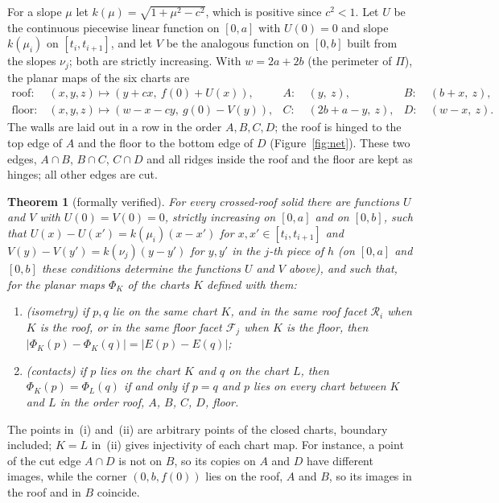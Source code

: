\documentclass[11pt]{article}
\newtheorem{theorem}{Theorem}
\theoremstyle{definition}
\theoremstyle{remark}
\newcommand{\cR}{\mathcal R}
\newcommand{\cF}{\mathcal F}
\begin{document}
For a slope $\mu$ let $k(\mu)=\sqrt{1+\mu^2-c^2}$, which is positive since
$c^2<1$. Let $U$ be the continuous piecewise linear function on $[0,a]$ with
$U(0)=0$ and slope $k(\mu_i)$ on $[t_i,t_{i+1}]$, and let $V$ be the
analogous function on $[0,b]$ built from the slopes $\nu_j$; both are
strictly increasing. With $w=2a+2b$ (the perimeter of $\Pi$), the planar
maps of the six charts are
\begin{align*}
\text{roof}:&\ (x,y,z)\mapsto(y+cx,\ f(0)+U(x)), &
A:&\ (y,\ z), & B:&\ (b+x,\ z),\\
\text{floor}:&\ (x,y,z)\mapsto(w-x-cy,\ g(0)-V(y)), &
C:&\ (2b+a-y,\ z), & D:&\ (w-x,\ z).
\end{align*}
The walls are laid out in a row in the order $A,B,C,D$; the roof is hinged to
the top edge of $A$ and the floor to the bottom edge of $D$
(Figure~\ref{fig:net}). These two edges, $A\cap B$, $B\cap C$, $C\cap D$ and all
ridges inside the roof and the floor are kept as hinges; all other edges are
cut.

\begin{theorem}[formally verified]\label{thm:main}
For every crossed-roof solid there are functions $U$ and $V$ with
$U(0)=V(0)=0$, strictly increasing on $[0,a]$ and on $[0,b]$, such that
$U(x)-U(x')=k(\mu_i)(x-x')$ for $x,x'\in[t_i,t_{i+1}]$ and
$V(y)-V(y')=k(\nu_j)(y-y')$ for $y,y'$ in the $j$-th piece of $h$ (on
$[0,a]$ and $[0,b]$ these conditions determine the functions $U$ and $V$
above), and such that, for the planar maps $\Phi_K$ of the charts $K$
defined with them:
\begin{enumerate}
\item[(i)] \emph{(isometry)} if $p,q$ lie on the same chart $K$, and in the
same roof facet $\cR_i$ when $K$ is the roof, or in the same floor facet
$\cF_j$ when $K$ is the floor, then $|\Phi_K(p)-\Phi_K(q)|=|E(p)-E(q)|$;
\item[(ii)] \emph{(contacts)} if $p$ lies on the chart $K$ and $q$ on the
chart $L$, then $\Phi_K(p)=\Phi_L(q)$ if and only if $p=q$ and $p$ lies on
every chart between $K$ and $L$ in the order roof, $A$, $B$, $C$, $D$, floor.
\end{enumerate}
\end{theorem}

\noindent The points in~(i) and~(ii) are arbitrary points of the closed
charts, boundary included; $K=L$ in~(ii) gives injectivity of each chart map.
For instance, a point of the cut edge $A\cap D$ is not on $B$, so its copies
on $A$ and $D$ have different images, while the corner $(0,b,f(0))$ lies on
the roof, $A$ and $B$, so its images in the roof and in $B$ coincide.
\end{document}
